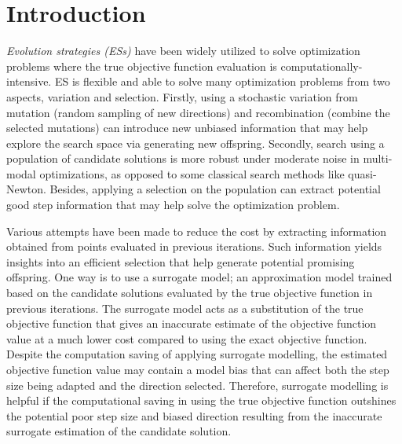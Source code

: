 \section{Introduction}

\textit{Evolution strategies (ESs)} have been widely utilized to solve optimization problems where the true objective function evaluation is computationally-intensive. ES is flexible and able to solve many optimization problems from two aspects, variation and selection. Firstly, using a stochastic variation from mutation (random sampling of new directions) and recombination (combine the selected mutations) can introduce new unbiased information that may help explore the search space via generating new offspring. Secondly, search using a population of candidate solutions is more robust under moderate noise in multi-modal optimizations, as opposed to some classical search methods like quasi-Newton. Besides, applying a selection on the population can extract potential good step information that may help solve the optimization problem. 

Various attempts have been made to reduce the cost by extracting information obtained from points evaluated in previous iterations. Such information yields insights into an efficient selection that help generate potential promising offspring. One way is to use a surrogate model; an approximation model trained based on the candidate solutions evaluated by the true objective function in previous iterations. The surrogate model acts as a substitution of the true objective function that gives an inaccurate estimate of the objective function value at a much lower cost compared to using the exact objective function. Despite the computation saving of applying surrogate modelling, the estimated objective function value may contain a model bias that can affect both the step size being adapted and the direction selected. Therefore, surrogate modelling is helpful if the computational saving in using the true objective function outshines the potential poor step size and biased direction resulting from the inaccurate surrogate estimation of the candidate solution. 

